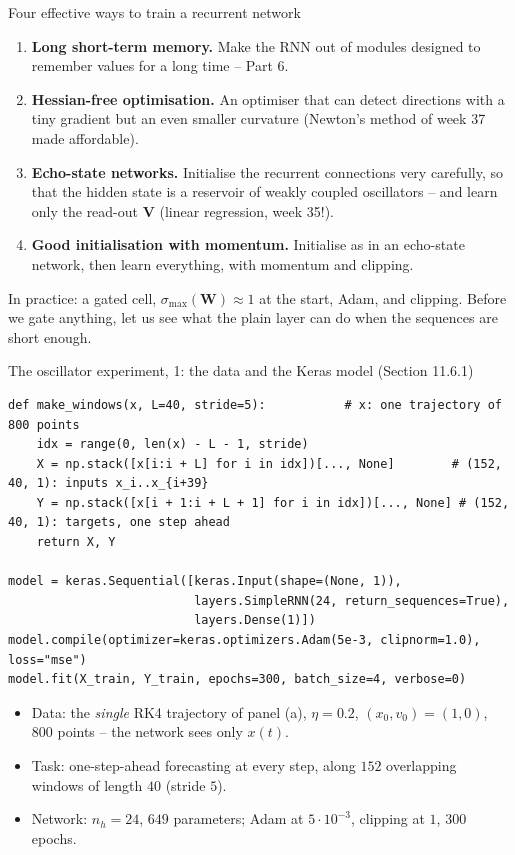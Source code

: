 \documentclass[10pt,aspectratio=169]{beamer}
\begin{document}
\begin{frame}{Four effective ways to train a recurrent network}
\begin{enumerate}
  \item \textbf{Long short-term memory.}  Make the RNN out of modules
        designed to remember values for a long time -- Part 6.
  \item \textbf{Hessian-free optimisation.}  An optimiser that can detect
        directions with a tiny gradient but an even smaller curvature
        (Newton's method of week 37 made affordable).
  \item \textbf{Echo-state networks.}  Initialise the recurrent
        connections very carefully, so that the hidden state is a reservoir
        of weakly coupled oscillators -- and learn only the read-out $\bm{V}$
        (linear regression, week 35!).
  \item \textbf{Good initialisation with momentum.}  Initialise as in an
        echo-state network, then learn everything, with momentum and
        clipping.
\end{enumerate}
\medskip
In practice: a gated cell, $\sigma_{\max}(\bm{W})\approx1$ at the start,
Adam, and clipping.  Before we gate anything, let us see what the plain
layer can do when the sequences are short enough.
\end{frame}

\begin{frame}[fragile]{The oscillator experiment, 1: the data and the Keras model (Section 11.6.1)}
\begin{lstlisting}
def make_windows(x, L=40, stride=5):           # x: one trajectory of 800 points
    idx = range(0, len(x) - L - 1, stride)
    X = np.stack([x[i:i + L] for i in idx])[..., None]        # (152, 40, 1): inputs x_i..x_{i+39}
    Y = np.stack([x[i + 1:i + L + 1] for i in idx])[..., None] # (152, 40, 1): targets, one step ahead
    return X, Y

model = keras.Sequential([keras.Input(shape=(None, 1)),
                          layers.SimpleRNN(24, return_sequences=True),
                          layers.Dense(1)])
model.compile(optimizer=keras.optimizers.Adam(5e-3, clipnorm=1.0), loss="mse")
model.fit(X_train, Y_train, epochs=300, batch_size=4, verbose=0)
\end{lstlisting}
\small
\begin{itemize}
  \item Data: the \emph{single} RK4 trajectory of panel (a), $\eta=0.2$,
        $(x_0,v_0)=(1,0)$, $800$ points -- the network sees only $x(t)$.
  \item Task: one-step-ahead forecasting at every step, along $152$
        overlapping windows of length $40$ (stride $5$).
  \item Network: $n_h=24$, $649$ parameters; Adam at $5\cdot10^{-3}$,
        clipping at $1$, $300$ epochs.
\end{itemize}
\end{frame}
\end{document}
